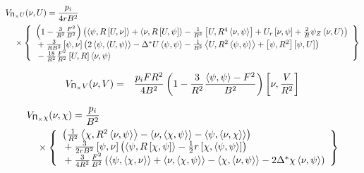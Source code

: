 \begin{eqnarray*}
  & \lefteqn{V_{\P_\times U}(\nu, U) = \frac{p_i}{4 r B^2}} &
  \\ && \mbox{} \times 
  \left\{ \begin{array}{l}
    \left(1 - \frac{3}{R^2} \frac{F^2}{B^2} \right)
    \left( \ip{\psi}{R \pb{U}{\nu}}+\ip{\nu}{R \pb{U}{\psi}}
          -\frac{1}{R^3} \pb{U}{R^4 \ip{\nu}{\psi}}
	  +U_r \pb{\nu}{\psi} + \frac{2}{R} \psi_Z \ip{\nu}{U} \right)
    \\ \mbox{} + 
    \frac{3}{R B^2} \pb{\psi}{\nu}
    \left( 2\ip{\psi}{\ip{U}{\psi}} - \gs{U}\ip{\psi}{\psi} 
          - \frac{1}{R^2}\ip{U}{R^2\ip{\psi}{\psi}} 
	  +\pb{\psi}{R^2}\pb{\psi}{U} \right)
    \\ \mbox{} - 
    \frac{18}{R^2} \frac{F^2}{B^2} \pb{U}{R} \ip{\nu}{\psi}
  \end{array} \right\}
\end{eqnarray*}

\begin{eqnarray*}
  V_{\mathsf{\Pi}_\times V}(\nu, V) & = & \frac{p_i F R^2}{4 B^2}
  \left(1 - \frac{3}{R^2} \frac{\left\langle \psi,\psi\right\rangle - F^2}{B^2} \right)
    \left[\nu,\frac{V}{R^2}\right]
\end{eqnarray*}

\begin{eqnarray*}
  & \lefteqn{V_{\P_\times \chi}(\nu, \chi) = \frac{p_i}{B^2}} &
  \\ && \mbox{} \times 
  \left\{ \begin{array}{l}
    \left( \frac{1}{R^2}\ip{\chi}{R^2 \ip{\nu}{\psi}}
          -\ip{\nu}{\ip{\chi}{\psi}} - \ip{\psi}{\ip{\nu}{\chi}} \right)
    \\ \mbox{} + \frac{3}{2 r B^2} \pb{\psi}{\nu}
    \left( \ip{\psi}{R \pb{\chi}{\psi}} 
         - \frac{1}{2} r \pb{\chi}{\ip{\psi}{\psi}} \right)
    \\ \mbox{} + \frac{3}{4 R^2} \frac{F^2}{B^2}
    \left( \ip{\psi}{\ip{\chi}{\nu}} + \ip{\nu}{\ip{\chi}{\psi}}
          -\ip{\chi}{\ip{\nu}{\psi}} - 2 \gs{\chi}\ip{\nu}{\psi} \right)
  \end{array} \right\}
\end{eqnarray*}

